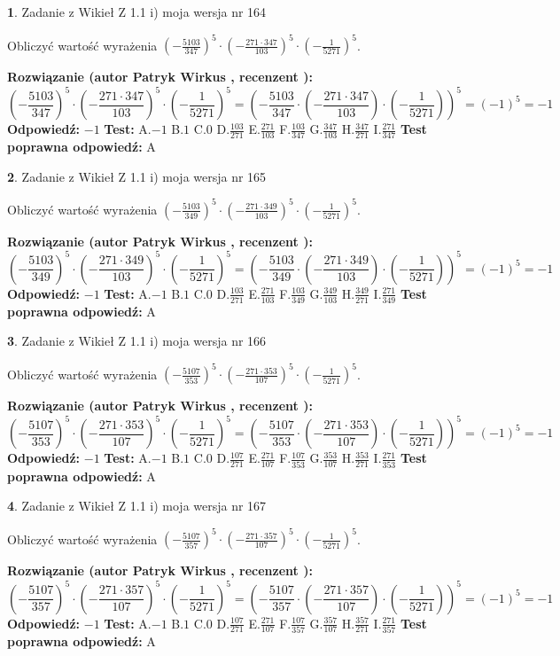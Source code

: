 \documentclass[12pt, a4paper]{article}
\theoremstyle{definition} %
\newtheorem{zad}{}
\newcommand{\zadStart}[1]{\begin{zad}#1\newline}
\newcommand{\zadStop}{\end{zad}}
\newcommand{\rozwStart}[2]{\noindent \textbf{Rozwiązanie (autor #1 , recenzent #2): }\newline}
\newcommand{\rozwStop}{\newline}
\newcommand{\odpStart}{\noindent \textbf{Odpowiedź:}\newline}
\newcommand{\odpStop}{\newline}
\newcommand{\testStart}{\noindent \textbf{Test:}\newline}
\newcommand{\testStop}{\newline}
\newcommand{\kluczStart}{\noindent \textbf{Test poprawna odpowiedź:}\newline}
\newcommand{\kluczStop}{\newline}
\begin{document}
\zadStart{Zadanie z Wikieł Z 1.1 i) moja wersja nr 164}

Obliczyć wartość wyrażenia $(-\frac{5103}{347})^{5} \cdot (-\frac{271 \cdot 347}{103})^{5} \cdot (-\frac{1}{5271})^{5}$.
\zadStop
\rozwStart{Patryk Wirkus}{}
$$(-\frac{5103}{347})^{5} \cdot (-\frac{271 \cdot 347}{103})^{5} \cdot (-\frac{1}{5271})^{5} = (-\frac{5103}{347} \cdot (-\frac{271 \cdot 347}{103}) \cdot (-\frac{1}{5271}))^{5} = (-1)^{5} = -1$$
\rozwStop
\odpStart
$-1$
\odpStop
\testStart
A.$-1$ B.$1$ C.$0$ D.$\frac{103}{271}$ E.$\frac{271}{103}$
F.$\frac{103}{347}$ G.$\frac{347}{103}$
H.$\frac{347}{271}$
I.$\frac{271}{347}$
\testStop
\kluczStart
A
\kluczStop



\zadStart{Zadanie z Wikieł Z 1.1 i) moja wersja nr 165}

Obliczyć wartość wyrażenia $(-\frac{5103}{349})^{5} \cdot (-\frac{271 \cdot 349}{103})^{5} \cdot (-\frac{1}{5271})^{5}$.
\zadStop
\rozwStart{Patryk Wirkus}{}
$$(-\frac{5103}{349})^{5} \cdot (-\frac{271 \cdot 349}{103})^{5} \cdot (-\frac{1}{5271})^{5} = (-\frac{5103}{349} \cdot (-\frac{271 \cdot 349}{103}) \cdot (-\frac{1}{5271}))^{5} = (-1)^{5} = -1$$
\rozwStop
\odpStart
$-1$
\odpStop
\testStart
A.$-1$ B.$1$ C.$0$ D.$\frac{103}{271}$ E.$\frac{271}{103}$
F.$\frac{103}{349}$ G.$\frac{349}{103}$
H.$\frac{349}{271}$
I.$\frac{271}{349}$
\testStop
\kluczStart
A
\kluczStop



\zadStart{Zadanie z Wikieł Z 1.1 i) moja wersja nr 166}

Obliczyć wartość wyrażenia $(-\frac{5107}{353})^{5} \cdot (-\frac{271 \cdot 353}{107})^{5} \cdot (-\frac{1}{5271})^{5}$.
\zadStop
\rozwStart{Patryk Wirkus}{}
$$(-\frac{5107}{353})^{5} \cdot (-\frac{271 \cdot 353}{107})^{5} \cdot (-\frac{1}{5271})^{5} = (-\frac{5107}{353} \cdot (-\frac{271 \cdot 353}{107}) \cdot (-\frac{1}{5271}))^{5} = (-1)^{5} = -1$$
\rozwStop
\odpStart
$-1$
\odpStop
\testStart
A.$-1$ B.$1$ C.$0$ D.$\frac{107}{271}$ E.$\frac{271}{107}$
F.$\frac{107}{353}$ G.$\frac{353}{107}$
H.$\frac{353}{271}$
I.$\frac{271}{353}$
\testStop
\kluczStart
A
\kluczStop



\zadStart{Zadanie z Wikieł Z 1.1 i) moja wersja nr 167}

Obliczyć wartość wyrażenia $(-\frac{5107}{357})^{5} \cdot (-\frac{271 \cdot 357}{107})^{5} \cdot (-\frac{1}{5271})^{5}$.
\zadStop
\rozwStart{Patryk Wirkus}{}
$$(-\frac{5107}{357})^{5} \cdot (-\frac{271 \cdot 357}{107})^{5} \cdot (-\frac{1}{5271})^{5} = (-\frac{5107}{357} \cdot (-\frac{271 \cdot 357}{107}) \cdot (-\frac{1}{5271}))^{5} = (-1)^{5} = -1$$
\rozwStop
\odpStart
$-1$
\odpStop
\testStart
A.$-1$ B.$1$ C.$0$ D.$\frac{107}{271}$ E.$\frac{271}{107}$
F.$\frac{107}{357}$ G.$\frac{357}{107}$
H.$\frac{357}{271}$
I.$\frac{271}{357}$
\testStop
\kluczStart
A
\kluczStop
\end{document}
